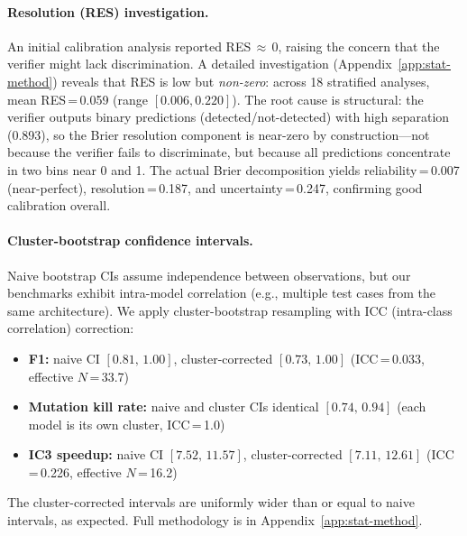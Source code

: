 \documentclass[11pt]{article}
\begin{document}
\paragraph{Resolution (RES) investigation.}
An initial calibration analysis reported RES\,$\approx$\,0, raising
the concern that the verifier might lack discrimination.
A detailed investigation (Appendix~\ref{app:stat-method}) reveals
that RES is low but \emph{non-zero}: across 18 stratified analyses,
mean RES\,=\,0.059 (range $[0.006, 0.220]$).  The root cause is
structural: the verifier outputs binary predictions
(detected/not-detected) with high separation (0.893), so the
Brier resolution component is near-zero by construction---not
because the verifier fails to discriminate, but because all
predictions concentrate in two bins near 0 and 1.  The actual
Brier decomposition yields reliability\,=\,0.007 (near-perfect),
resolution\,=\,0.187, and uncertainty\,=\,0.247, confirming good
calibration overall.

\paragraph{Cluster-bootstrap confidence intervals.}
Naive bootstrap CIs assume independence between observations, but
our benchmarks exhibit intra-model correlation (e.g., multiple
test cases from the same architecture).  We apply cluster-bootstrap
resampling with ICC (intra-class correlation) correction:
\begin{itemize}[leftmargin=2em,nosep]
  \item \textbf{F1:} naive CI $[0.81,\, 1.00]$, cluster-corrected
    $[0.73,\, 1.00]$ (ICC\,=\,0.033, effective $N$\,=\,33.7)
  \item \textbf{Mutation kill rate:} naive and cluster CIs identical
    $[0.74,\, 0.94]$ (each model is its own cluster, ICC\,=\,1.0)
  \item \textbf{IC3 speedup:} naive CI $[7.52,\, 11.57]$,
    cluster-corrected $[7.11,\, 12.61]$ (ICC\,=\,0.226,
    effective $N$\,=\,16.2)
\end{itemize}
The cluster-corrected intervals are uniformly wider than or equal
to naive intervals, as expected.  Full methodology is in
Appendix~\ref{app:stat-method}.
\end{document}
